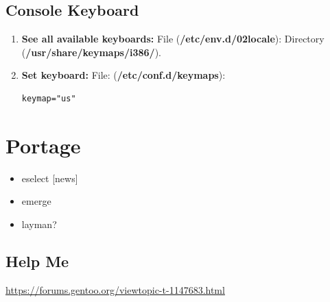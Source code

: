 \documentclass[10pt, a4paper, onecolumn, oneside, titlepage, openany]{book}
\begin{document}
\section{Console Keyboard}
\begin{enumerate}
    \item \textbf{See all available keyboards:}
\newline File (\textbf{\textcolor{file}{/etc/env.d/02locale}}):
\newline Directory (\textbf{\textcolor{dir}{/usr/share/keymaps/i386/}}).
    \item \textbf{Set keyboard:}
\newline File: (\textbf{\textcolor{file}{/etc/conf.d/keymaps}}):
\begin{verbatim}
keymap="us"
\end{verbatim}
\end{enumerate}

\chapter{Portage}
\begin{itemize}
    \item eselect [news]
    \item emerge
    \item layman?
\end{itemize}










\section{Help Me}
\url{https://forums.gentoo.org/viewtopic-t-1147683.html}
\end{document}
